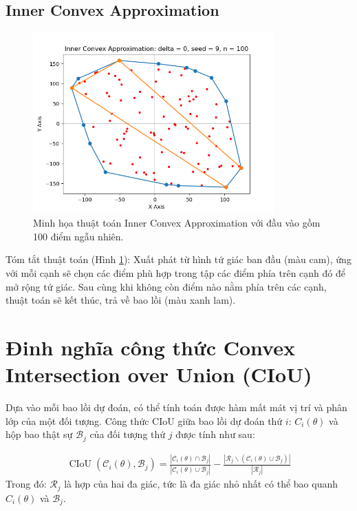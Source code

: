 \documentclass[12pt,a4paper,openany,oneside]{report}
\begin{document}
\subsection{Inner Convex Approximation}
\begin{figure}[ht!]
	\begin{center}
		\includegraphics[width=350px]{./inner_convex_brief.png}
		\caption{Minh họa thuật toán Inner Convex Approximation với đầu vào gồm 100 điểm ngẫu nhiên.}
		\label{inner_convex_brief}
	\end{center}
\end{figure} 
Tóm tắt thuật toán (Hình \ref{inner_convex_brief}): Xuất phát từ hình tứ giác ban đầu (màu cam), ứng với mỗi cạnh sẽ chọn các điểm phù hợp trong tập các điểm phía trên cạnh đó để mở rộng tứ giác. Sau cùng khi không còn điểm nào nằm phía trên các cạnh, thuật toán sẽ kết thúc, trả về bao lồi (màu xanh lam).
\section{Đinh nghĩa công thức Convex Intersection over Union (CIoU)}
Dựa vào mỗi bao lồi dự đoán, có thể tính toán được hàm mất mát vị trí và phân lớp của một đối tượng. Công thức CIoU giữa bao lồi dự đoán thứ $i$:  $C_i(\theta)$ và hộp bao thật sự $\mathcal{B}_j$ của đối tượng thứ $j$ được tính như sau:

\begin{align} \label{CioU_fomular}
	\operatorname{CIoU}\left(\mathcal{C}_i(\theta), \mathcal{B}_j\right)=\frac{\left|\mathcal{C}_i(\theta) \cap \mathcal{B}_j\right|}{\left|\mathcal{C}_i(\theta) \cup \mathcal{B}_j\right|}-\frac{\left|\mathcal{R}_j \backslash\left(\mathcal{C}_i(\theta) \cup \mathcal{B}_j\right)\right|}{\left|\mathcal{R}_j\right|}
\end{align}
Trong đó: $\mathcal{R}_j$ là hợp của hai đa giác, tức là đa giác nhỏ nhất có thể bao quanh  $C_i(\theta)$ và $\mathcal{B}_j$.
\end{document}
